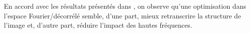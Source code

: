 \documentclass{article}
\begin{document}
\noindent En accord avec les résultats présentés dans \cite{FeatVizualize}, on observe qu'une optimisation dans l'espace Fourier/décorrélé semble, d'une part, mieux retranscrire la structure de l'image et, d'autre part, réduire l'impact des hautes fréquences.\\%

\end{document}

